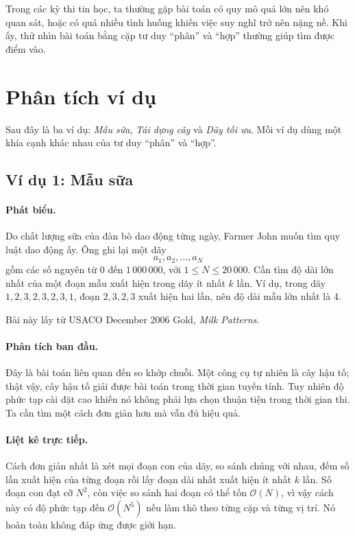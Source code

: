\documentclass[11pt]{article}
\newcommand{\Oh}{\mathcal{O}}
\begin{document}
Trong các kỳ thi tin học, ta thường gặp bài toán có quy mô quá lớn nên khó
quan sát, hoặc có quá nhiều tình huống khiến việc suy nghĩ trở nên nặng nề.
Khi ấy, thử nhìn bài toán bằng cặp tư duy ``phân'' và ``hợp'' thường giúp tìm
được điểm vào.

\section{Phân tích ví dụ}

Sau đây là ba ví dụ: \textit{Mẫu sữa}, \textit{Tái dựng cây} và \textit{Dãy
tối ưu}. Mỗi ví dụ dùng một khía cạnh khác nhau của tư duy ``phân'' và
``hợp''.

\subsection{Ví dụ 1: Mẫu sữa}

\paragraph{Phát biểu.}
Do chất lượng sữa của đàn bò dao động từng ngày, Farmer John muốn tìm quy
luật dao động ấy. Ông ghi lại một dãy
\[
  a_1,a_2,\ldots,a_N
\]
gồm các số nguyên từ \(0\) đến \(1\,000\,000\), với
\(1\le N\le 20\,000\). Cần tìm độ dài lớn nhất của một đoạn mẫu xuất hiện
trong dãy ít nhất \(k\) lần. Ví dụ, trong dãy \(1,2,3,2,3,2,3,1\), đoạn
\(2,3,2,3\) xuất hiện hai lần, nên độ dài mẫu lớn nhất là \(4\).

Bài này lấy từ USACO December 2006 Gold, \textit{Milk Patterns}.

\paragraph{Phân tích ban đầu.}
Đây là bài toán liên quan đến so khớp chuỗi. Một công cụ tự nhiên là cây hậu
tố; thật vậy, cây hậu tố giải được bài toán trong thời gian tuyến tính. Tuy
nhiên độ phức tạp cài đặt cao khiến nó không phải lựa chọn thuận tiện trong
thời gian thi. Ta cần tìm một cách đơn giản hơn mà vẫn đủ hiệu quả.

\paragraph{Liệt kê trực tiếp.}
Cách đơn giản nhất là xét mọi đoạn con của dãy, so sánh chúng với nhau, đếm
số lần xuất hiện của từng đoạn rồi lấy đoạn dài nhất xuất hiện ít nhất \(k\)
lần. Số đoạn con đạt cỡ \(N^2\), còn việc so sánh hai đoạn có thể tốn
\(\Oh(N)\), vì vậy cách này có độ phức tạp đến \(\Oh(N^5)\) nếu làm thô theo
từng cặp và từng vị trí. Nó hoàn toàn không đáp ứng được giới hạn.
\end{document}
